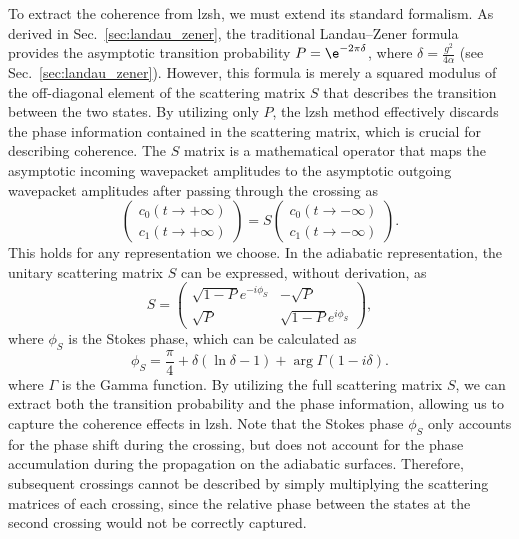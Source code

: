 To extract the coherence from \acrshort{lzsh}, we must extend its standard formalism. As derived in Sec.~\ref{sec:landau_zener}, the traditional Landau--Zener formula provides the asymptotic transition probability $P=\e^{-2\pi\delta}$, where $\delta=\frac{g^2}{4\alpha}$ (see Sec.~\ref{sec:landau_zener}). However, this formula is merely a squared modulus of the off-diagonal element of the scattering matrix $S$ that describes the transition between the two states. By utilizing only $P$, the \acrshort{lzsh} method effectively discards the phase information contained in the scattering matrix, which is crucial for describing coherence. The $S$ matrix is a mathematical operator that maps the asymptotic incoming wavepacket amplitudes to the asymptotic outgoing wavepacket amplitudes after passing through the crossing as
\begin{equation}
\begin{pmatrix}
c_0(t\to+\infty)\\
c_1(t\to+\infty)
\end{pmatrix}=S\begin{pmatrix}
c_0(t\to-\infty)\\
c_1(t\to-\infty)
\end{pmatrix}.
\end{equation}
This holds for any representation we choose. In the adiabatic representation, the unitary scattering matrix $S$ can be expressed, without derivation, as
\begin{equation}
S=\begin{pmatrix}
\sqrt{1-P}e^{-i\phi_S}&-\sqrt{P}\\
\sqrt{P}&\sqrt{1-P}e^{i\phi_S}
\end{pmatrix},
\end{equation}
where $\phi_S$ is the Stokes phase, which can be calculated as
\begin{equation}
\phi_S=\frac{\pi}{4}+\delta\left(\ln\delta-1\right)+\arg\Gamma(1-i\delta).
\end{equation}
where $\Gamma$ is the Gamma function. By utilizing the full scattering matrix $S$, we can extract both the transition probability and the phase information, allowing us to capture the coherence effects in \acrshort{lzsh}. Note that the Stokes phase $\phi_S$ only accounts for the phase shift during the crossing, but does not account for the phase accumulation during the propagation on the adiabatic surfaces. Therefore, subsequent crossings cannot be described by simply multiplying the scattering matrices of each crossing, since the relative phase between the states at the second crossing would not be correctly captured.


